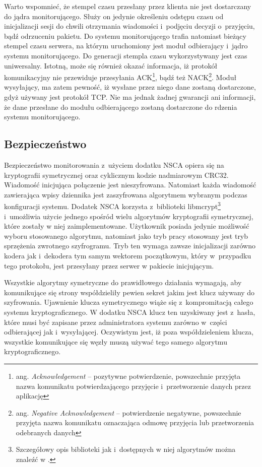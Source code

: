 Warto wspomnieć, że stempel czasu przesłany przez klienta nie jest
dostarczany do jądra monitorującego. Służy on jedynie określeniu
odstępu czasu od inicjalizacji sesji do chwili otrzymania wiadomości
i~podjęciu decyzji o~przyjęciu, bądź odrzuceniu pakietu. Do systemu
monitorującego trafia natomiast bieżący stempel czasu serwera, na
którym uruchomiony jest moduł odbierający i~jądro systemu
monitorującego. Do generacji stempla czasu wykorzystywany jest czas
uniwersalny. Istotną, może się również okazać informacja, iż protokół
komunikacyjny nie przewiduje przesyłania ACK\footnote {ang. {\em
    Acknowledgement} -- pozytywne potwierdzenie, powszechnie przyjęta
  nazwa komunikatu potwierdzającego przyjęcie i~przetworzenie danych
  przez aplikację}, bądź też NACK\footnote{ang. {\em Negative
    Acknowledgement} -- potwierdzenie negatywne, powszechnie przyjęta
  nazwa komunikatu oznaczająca odmowę przyjęcia lub przetworzenia
  odebranych danych}. Moduł wysyłający, ma zatem pewność, iż wysłane
przez niego dane zostaną dostarczone, gdyż używany jest protokół TCP.
Nie ma jednak żadnej gwarancji ani informacji, że dane przesłane do
modułu odbierającego zostaną dostarczone do rdzenia systemu
monitorującego.

\subsection[Bezpieczeństwo][Bezpieczeństwo]{Bezpieczeństwo}

Bezpieczeństwo monitorowania z~użyciem dodatku NSCA opiera się na
kryptografii symetrycznej oraz cyklicznym kodzie nadmiarowym
CRC32. Wiadomość inicjująca połączenie jest nieszyfrowana. Natomiast
każda wiadomość zawierająca wpisy dziennika jest zaszyfrowana
algorytmem wybranym podczas konfiguracji systemu. Dodatek NSCA
korzysta z~biblioteki libmcrypt\footnote{Szczegółowy opis biblioteki
  jak i~dostępnych w niej algorytmów można znaleźć w
  \cite{www:libmcrypt}.} i~umożliwia użycie jednego spośród wielu
algorytmów kryptografii symetrycznej, które zostały w niej
zaimplementowane. Użytkownik posiada jedynie możliwość wyboru
stosowanego algorytmu, natomiast jako tryb pracy stosowany jest tryb
sprzężenia zwrotnego szyfrogramu. Tryb ten wymaga zawsze inicjalizacji
zarówno kodera jak i~dekodera tym samym wektorem początkowym, który
w~przypadku tego protokołu, jest przesyłany przez serwer w pakiecie
inicjującym.

Wszystkie algorytmy symetryczne do prawidłowego działania wymagają,
aby komunikujące się strony współdzieliły pewien sekret jakim jest
klucz używany do szyfrowania. Ujawnienie klucza symetrycznego wiąże
się z~kompromitacją całego systemu kryptograficznego. W dodatku NSCA
klucz ten uzyskiwany jest z~hasła, które musi być zapisane przez
administratora systemu zarówno w~części odbierającej jak
i~wysyłającej. Oczywistym jest, iż poza współdzieleniem klucza,
wszystkie komunikujące się węzły muszą używać tego samego algorytmu
kryptograficznego.

